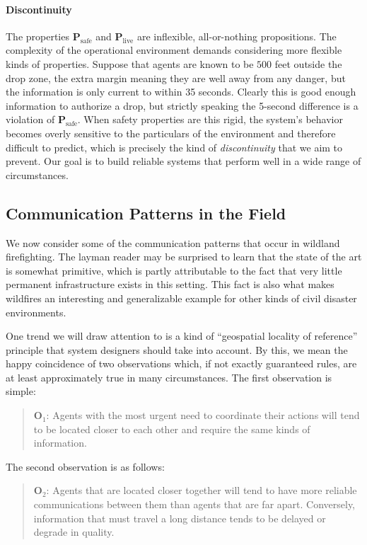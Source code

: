 \documentclass[]             %
{NASA}                       %
\theoremstyle{definition}
\begin{document}
\paragraph{Discontinuity}
The properties $\mathbf{P}_\textrm{safe}$ and
$\mathbf{P}_\textrm{live}$ are inflexible, all-or-nothing
propositions. The complexity of the operational environment demands
considering more flexible kinds of properties. Suppose that agents are
known to be $500$ feet outside the drop zone, the extra margin meaning
they are well away from any danger, but the information is only
current to within 35 seconds. Clearly this is good enough information
to authorize a drop, but strictly speaking the 5-second difference is
a violation of $\mathbf{P}_\textrm{safe}$. When safety properties are
this rigid, the system's behavior becomes overly sensitive to the
particulars of the environment and therefore difficult to predict,
which is precisely the kind of \emph{discontinuity} that we aim to
prevent. Our goal is to build reliable systems that perform well in a
wide range of circumstances.

\subsection{Communication Patterns in the Field}
\label{ssec:communication-patterns}

We now consider some of the communication patterns that occur in
wildland firefighting. The layman reader may be surprised to learn
that the state of the art is somewhat primitive, which is partly
attributable to the fact that very little permanent infrastructure
exists in this setting. This fact is also what makes wildfires an
interesting and generalizable example for other kinds of civil
disaster environments.

One trend we will draw attention to is a kind of ``geospatial locality
of reference'' principle that system designers should take into
account. By this, we mean the happy coincidence of two observations
which, if not exactly guaranteed rules, are at least approximately
true in many circumstances. The first observation is simple:
\begin{quote}
  $\textbf{O}_1$: Agents with the most urgent need to
  coordinate their actions will tend to be located closer to each
  other and require the same kinds of information.
\end{quote}
The second observation is as follows:
\begin{quote}
  $\textbf{O}_2$: Agents that are located closer together
  will tend to have more reliable communications between them than
  agents that are far apart. Conversely, information that must travel
  a long distance tends to be delayed or degrade in quality.
\end{quote}
\end{document}
